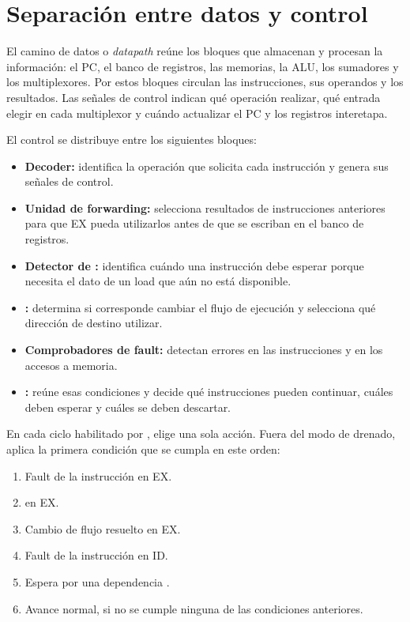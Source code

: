 \section{Separación entre datos y control}

El camino de datos o \emph{datapath} reúne los bloques que almacenan y
procesan la información: el PC, el banco de registros, las memorias, la ALU,
los sumadores y los multiplexores. Por estos bloques circulan las
instrucciones, sus operandos y los resultados. Las señales de control indican
qué operación realizar, qué entrada elegir en cada multiplexor y cuándo
actualizar el PC y los registros interetapa.

El control se distribuye entre los siguientes bloques:

\begin{itemize}
  \item \textbf{Decoder:} identifica la operación que solicita cada instrucción
  y genera sus señales de control.
  \item \textbf{Unidad de forwarding:} selecciona resultados de instrucciones
  anteriores para que EX pueda utilizarlos antes de que se escriban en el
  banco de registros.
  \item \textbf{Detector de :} identifica cuándo una instrucción
  debe esperar porque necesita el dato de un load que aún no está disponible.
  \item \textbf{:} determina si corresponde cambiar el flujo
  de ejecución y selecciona qué dirección de destino utilizar.
  \item \textbf{Comprobadores de fault:} detectan errores en las instrucciones
  y en los accesos a memoria.
  \item \textbf{:} reúne esas condiciones y
  decide qué instrucciones pueden continuar, cuáles deben esperar y cuáles
  se deben descartar.
\end{itemize}

En cada ciclo habilitado por ,
 elige una sola acción. Fuera del modo de
drenado, aplica la primera condición que se cumpla en este orden:

\begin{enumerate}
  \item Fault de la instrucción en EX.
  \item {} en EX.
  \item Cambio de flujo resuelto en EX.
  \item Fault de la instrucción en ID.
  \item Espera por una dependencia .
  \item Avance normal, si no se cumple ninguna de las condiciones anteriores.
\end{enumerate}

